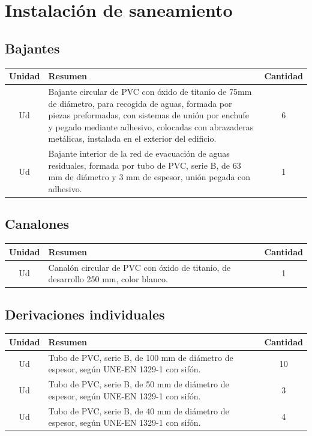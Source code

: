 \documentclass[../main.tex]{subfiles}
\begin{document}
\section{Instalación de saneamiento}
\subsection{Bajantes}
\begin{table}[H]
    \centering
    \begin{tabular}{c p{11.5cm} c}
        Unidad & Resumen & Cantidad  \\ \hline
        Ud & Bajante circular de PVC con óxido de titanio de 75mm de diámetro, para recogida de aguas, formada por piezas preformadas, con sistemas de unión por enchufe y pegado mediante adhesivo, colocadas con abrazaderas metálicas, instalada en el exterior del edificio. & 6 \\
        Ud & Bajante interior de la red de evacuación de aguas residuales, formada por tubo de PVC, serie B, de 63 mm de diámetro y 3 mm de espesor, unión pegada con adhesivo. & 1 \\ 
    \end{tabular}
\end{table}

\subsection{Canalones}
\begin{table}[H]
    \centering
    \begin{tabular}{c p{11.5cm} c}
        Unidad & Resumen & Cantidad  \\ \hline
        Ud & Canalón circular de PVC con óxido de titanio, de desarrollo 250 mm, color blanco. & 1
    \end{tabular}
\end{table}

\subsection{Derivaciones individuales}
\begin{table}[H]
    \centering
    \begin{tabular}{c p{11.5cm} c}
        Unidad & Resumen & Cantidad  \\ \hline
        Ud & Tubo de PVC, serie B, de 100 mm de diámetro de espesor, según UNE-EN 1329-1 con sifón. & 10 \\
        Ud & Tubo de PVC, serie B, de 50 mm de diámetro de espesor, según UNE-EN 1329-1 con sifón. & 3\\
        Ud & Tubo de PVC, serie B, de 40 mm de diámetro de espesor, según UNE-EN 1329-1 con sifón. & 4\\
    \end{tabular}
\end{table}
\end{document}
